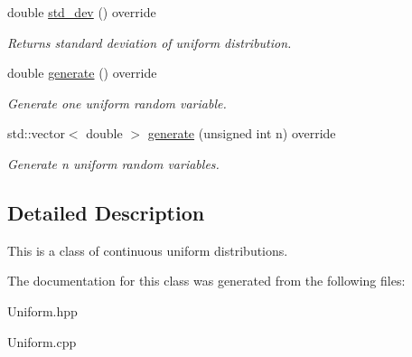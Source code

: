 \begin{DoxyCompactItemize}
\mbox{\label{classUniform_a0ed9717de39298a146e9c6c803e108c3}} 
double \hyperlink{classUniform_a0ed9717de39298a146e9c6c803e108c3}{std\+\_\+dev} () override
\begin{DoxyCompactList}\small\item\em Returns standard deviation of uniform distribution. \end{DoxyCompactList}\item 
\mbox{\label{classUniform_ab9562a5945249b603a26f1c6e9be1091}} 
double \hyperlink{classUniform_ab9562a5945249b603a26f1c6e9be1091}{generate} () override
\begin{DoxyCompactList}\small\item\em Generate one uniform random variable. \end{DoxyCompactList}\item 
\mbox{\label{classUniform_aaa0e8ed42a608adb40c6a702cbaa0519}} 
std\+::vector$<$ double $>$ \hyperlink{classUniform_aaa0e8ed42a608adb40c6a702cbaa0519}{generate} (unsigned int n) override
\begin{DoxyCompactList}\small\item\em Generate n uniform random variables. \end{DoxyCompactList}\end{DoxyCompactItemize}


\subsection{Detailed Description}
This is a class of continuous uniform distributions. 

The documentation for this class was generated from the following files\+:\begin{DoxyCompactItemize}
\item 
Uniform.\+hpp\item 
Uniform.\+cpp\end{DoxyCompactItemize}
